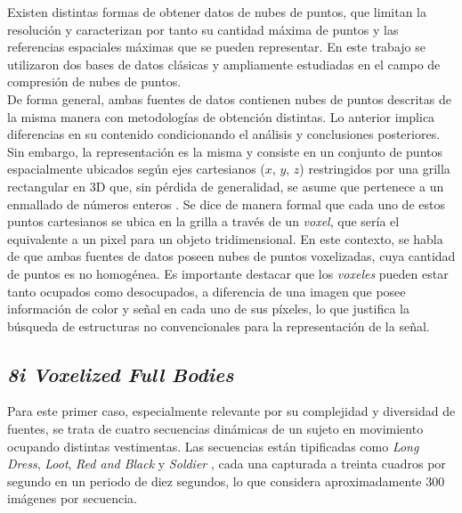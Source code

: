     Existen distintas formas de obtener datos de nubes de puntos, que limitan la resolución y caracterizan por tanto su cantidad máxima de puntos y las referencias espaciales máximas que se pueden representar. En este trabajo se utilizaron dos bases de datos clásicas y ampliamente estudiadas en el campo de compresión de nubes de puntos.\\

    De forma general, ambas fuentes de datos contienen nubes de puntos descritas de la misma manera con metodologías de obtención distintas. Lo anterior implica diferencias en su contenido condicionando el análisis y conclusiones posteriores. Sin embargo, la representación es la misma y consiste en un conjunto de puntos espacialmente ubicados según ejes cartesianos ($x$, $y$, $z$) restringidos por una grilla rectangular en 3D que, sin pérdida de generalidad, se asume que pertenece a un enmallado de números enteros \cite{deon2017voxelized}. Se dice de manera formal que cada uno de estos puntos cartesianos se ubica en la grilla a través de un \textit{voxel}, que sería el equivalente a un pixel para un objeto tridimensional. En este contexto, se habla de que ambas fuentes de datos poseen nubes de puntos voxelizadas, cuya cantidad de puntos es no homogénea. Es importante destacar que los \textit{voxeles} pueden estar tanto ocupados como desocupados, a diferencia de una imagen que posee información de color y señal en cada uno de sus píxeles, lo que justifica la búsqueda de estructuras no convencionales para la representación de la señal.\\
    
    \subsection{\textit{8i Voxelized Full Bodies}}
        Para este primer caso, especialmente relevante por su complejidad y diversidad de fuentes, se trata de cuatro secuencias dinámicas de un sujeto en movimiento ocupando distintas vestimentas. Las secuencias están tipificadas como \textit{Long Dress}, \textit{Loot}, \textit{Red and Black} y \textit{Soldier} , cada una capturada a treinta cuadros por segundo en un periodo de diez segundos, lo que considera aproximadamente 300 imágenes por secuencia.

